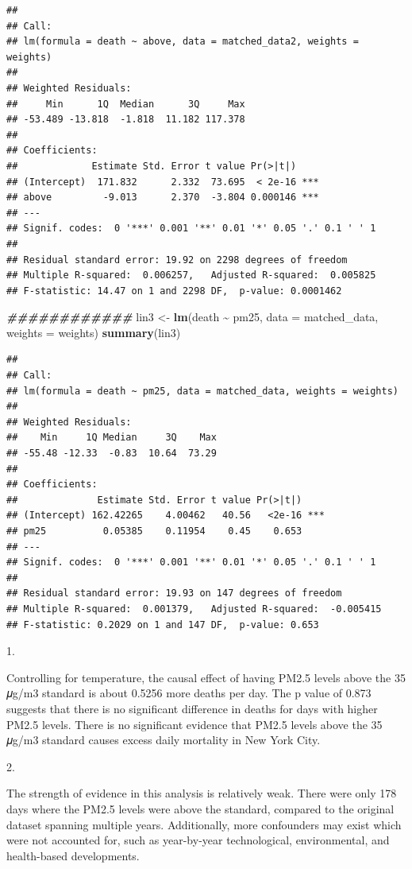 \documentclass[
]{article}
\newenvironment{Shaded}{\begin{snugshade}}{\end{snugshade}}
\newcommand{\AttributeTok}[1]{\textcolor[rgb]{0.13,0.29,0.53}{#1}}
\newcommand{\DocumentationTok}[1]{\textcolor[rgb]{0.56,0.35,0.01}{\textbf{\textit{#1}}}}
\newcommand{\FunctionTok}[1]{\textcolor[rgb]{0.13,0.29,0.53}{\textbf{#1}}}
\newcommand{\NormalTok}[1]{#1}
\newcommand{\OtherTok}[1]{\textcolor[rgb]{0.56,0.35,0.01}{#1}}
\newcommand{\SpecialCharTok}[1]{\textcolor[rgb]{0.81,0.36,0.00}{\textbf{#1}}}
\begin{document}
\begin{verbatim}
## 
## Call:
## lm(formula = death ~ above, data = matched_data2, weights = weights)
## 
## Weighted Residuals:
##     Min      1Q  Median      3Q     Max 
## -53.489 -13.818  -1.818  11.182 117.378 
## 
## Coefficients:
##             Estimate Std. Error t value Pr(>|t|)    
## (Intercept)  171.832      2.332  73.695  < 2e-16 ***
## above         -9.013      2.370  -3.804 0.000146 ***
## ---
## Signif. codes:  0 '***' 0.001 '**' 0.01 '*' 0.05 '.' 0.1 ' ' 1
## 
## Residual standard error: 19.92 on 2298 degrees of freedom
## Multiple R-squared:  0.006257,   Adjusted R-squared:  0.005825 
## F-statistic: 14.47 on 1 and 2298 DF,  p-value: 0.0001462
\end{verbatim}

\begin{Shaded}
\begin{Highlighting}[]
\DocumentationTok{\#\#\#\#\#\#\#\#\#\#\#\#}
\NormalTok{lin3 }\OtherTok{\textless{}{-}} \FunctionTok{lm}\NormalTok{(death }\SpecialCharTok{\textasciitilde{}}\NormalTok{ pm25, }\AttributeTok{data =}\NormalTok{ matched\_data, }\AttributeTok{weights =}\NormalTok{ weights)}
\FunctionTok{summary}\NormalTok{(lin3)}
\end{Highlighting}
\end{Shaded}

\begin{verbatim}
## 
## Call:
## lm(formula = death ~ pm25, data = matched_data, weights = weights)
## 
## Weighted Residuals:
##    Min     1Q Median     3Q    Max 
## -55.48 -12.33  -0.83  10.64  73.29 
## 
## Coefficients:
##              Estimate Std. Error t value Pr(>|t|)    
## (Intercept) 162.42265    4.00462   40.56   <2e-16 ***
## pm25          0.05385    0.11954    0.45    0.653    
## ---
## Signif. codes:  0 '***' 0.001 '**' 0.01 '*' 0.05 '.' 0.1 ' ' 1
## 
## Residual standard error: 19.93 on 147 degrees of freedom
## Multiple R-squared:  0.001379,   Adjusted R-squared:  -0.005415 
## F-statistic: 0.2029 on 1 and 147 DF,  p-value: 0.653
\end{verbatim}

1.

Controlling for temperature, the causal effect of having PM2.5 levels
above the 35 𝜇g/m3 standard is about 0.5256 more deaths per day. The p
value of 0.873 suggests that there is no significant difference in
deaths for days with higher PM2.5 levels. There is no significant
evidence that PM2.5 levels above the 35 𝜇g/m3 standard causes excess
daily mortality in New York City.

2.

The strength of evidence in this analysis is relatively weak. There were
only 178 days where the PM2.5 levels were above the standard, compared
to the original dataset spanning multiple years. Additionally, more
confounders may exist which were not accounted for, such as year-by-year
technological, environmental, and health-based developments.
\end{document}
